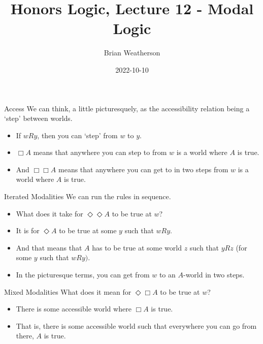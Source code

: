 \documentclass[
  14pt,
  letterpaper,
  ignorenonframetext,
  aspectratio=169,
]{beamer}
\title{Honors Logic, Lecture 12 - Modal Logic}
\author{Brian Weatherson}
\date{2022-10-10}
\providecommand{\tightlist}{%
  \setlength{\itemsep}{0pt}\setlength{\parskip}{0pt}}\usepackage{longtable,booktabs,array}
\begin{document}
\frame{\titlepage}
\ifdefined\Shaded\renewenvironment{Shaded}{\begin{tcolorbox}[enhanced, borderline west={3pt}{0pt}{shadecolor}, breakable, interior hidden, frame hidden, sharp corners, boxrule=0pt]}{\end{tcolorbox}}\fi

\begin{frame}{Access}
\protect\hypertarget{access}{}
We can think, a little picturesquely, as the accessibility relation
being a `step' between worlds.

\begin{itemize}[<+->]
\tightlist
\item
  If \(wRy\), then you can `step' from \(w\) to \(y\).
\item
  \(\Box A\) means that anywhere you can step to from \(w\) is a world
  where \(A\) is true.
\item
  And \(\Box \Box A\) means that anywhere you can get to in two steps
  from \(w\) is a world where \(A\) is true.
\end{itemize}
\end{frame}

\begin{frame}{Iterated Modalities}
\protect\hypertarget{iterated-modalities}{}
We can run the rules in sequence.

\begin{itemize}[<+->]
\tightlist
\item
  What does it take for \(\Diamond \Diamond A\) to be true at \(w\)?
\item
  It is for \(\Diamond A\) to be true at some \(y\) such that \(wRy\).
\item
  And that means that \(A\) has to be true at some world \(z\) such that
  \(yRz\) (for some \(y\) such that \(wRy)\).
\item
  In the picturesque terms, you can get from \(w\) to an \(A\)-world in
  two steps.
\end{itemize}
\end{frame}

\begin{frame}{Mixed Modalities}
\protect\hypertarget{mixed-modalities}{}
What does it mean for \(\Diamond \Box A\) to be true at \(w\)?

\begin{itemize}[<+->]
\tightlist
\item
  There is some accessible world where \(\Box A\) is true.
\item
  That is, there is some accessible world such that everywhere you can
  go from there, \(A\) is true.
\end{itemize}
\end{frame}
\end{document}
